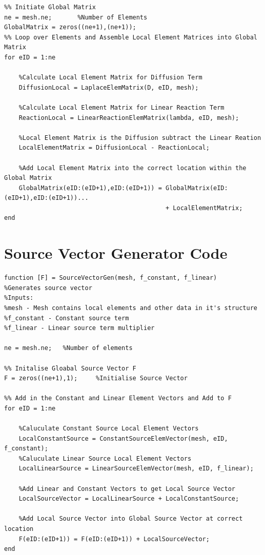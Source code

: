 \documentclass[11pt]{article}
\begin{document}
\begin{appendices}
\begin{lstlisting}
%% Initiate Global Matrix
ne = mesh.ne;       %Number of Elements
GlobalMatrix = zeros((ne+1),(ne+1));  
%% Loop over Elements and Assemble Local Element Matrices into Global Matrix
for eID = 1:ne
    
    %Calculate Local Element Matrix for Diffusion Term
    DiffusionLocal = LaplaceElemMatrix(D, eID, mesh);

    %Calculate Local Element Matrix for Linear Reaction Term
    ReactionLocal = LinearReactionElemMatrix(lambda, eID, mesh);
    
    %Local Element Matrix is the Diffusion subtract the Linear Reation
    LocalElementMatrix = DiffusionLocal - ReactionLocal;
                        
    %Add Local Element Matrix into the correct location within the Global Matrix
    GlobalMatrix(eID:(eID+1),eID:(eID+1)) = GlobalMatrix(eID:(eID+1),eID:(eID+1))...
                                            + LocalElementMatrix;
end
\end{lstlisting}
\pagebreak

\section{Source Vector Generator Code} \label{ap:SVG}
\begin{lstlisting}
function [F] = SourceVectorGen(mesh, f_constant, f_linear)
%Generates source vector
%Inputs:
%mesh - Mesh contains local elements and other data in it's structure
%f_constant - Constant source term
%f_linear - Linear source term multiplier

ne = mesh.ne;   %Number of elements

%% Initalise Gloabal Source Vector F
F = zeros((ne+1),1);     %Initialise Source Vector

%% Add in the Constant and Linear Element Vectors and Add to F
for eID = 1:ne
    
    %Caluculate Constant Source Local Element Vectors
    LocalConstantSource = ConstantSourceElemVector(mesh, eID, f_constant);
    %Caluculate Linear Source Local Element Vectors
    LocalLinearSource = LinearSourceElemVector(mesh, eID, f_linear);
    
    %Add Linear and Constant Vectors to get Local Source Vector
    LocalSourceVector = LocalLinearSource + LocalConstantSource;
    
    %Add Local Source Vector into Global Source Vector at correct location
    F(eID:(eID+1)) = F(eID:(eID+1)) + LocalSourceVector;
end
\end{lstlisting}


\end{appendices}
\end{document}
